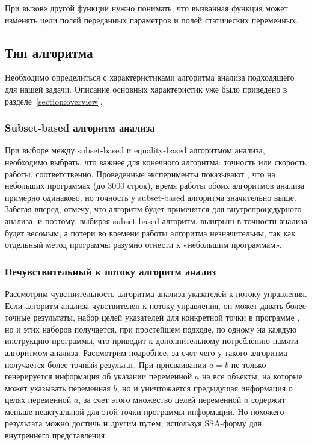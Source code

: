 \documentclass[14pt,titlepage]{extarticle}
\newenvironment{fresh}{\color{Blue}}{\color{black}}
\newcommand{\eng}[1]{{\English#1}}
\begin{document}
\begin{fresh}
      При вызове другой функции нужно понимать, что вызванная функция может
      изменять цели полей переданных параметров и полей статических переменных.


    \subsection{Тип алгоритма}

      Необходимо определиться с характеристиками алгоритма анализа
      подходящего для нашей задачи. Описание основных характеристик уже было
      приведено в разделе~\ref{section:overview}.

    \subsubsection{\eng{Subset-based} алгоритм анализа}

      При выборе между \eng{subset-based} и \eng{equality-based} алгоритмом
      анализа, необходимо выбрать, что важнее для конечного алгоритма:
      точность или скорость работы, соответственно. Проведенные эксперименты
      показывают \cite{shapiro_fast_and_accurate}, что на небольших программах
      (до 3000 строк), время работы обоих алгоритмов анализа примерно
      одинаково, но точность у \eng{subset-based} алгоритма значительно выше.
      Забегая вперед, отмечу, что алгоритм будет применятся для
      внутрепроцедурного анализа, и поэтому, выбирая \eng{subset-based}
      алгоритм, выигрыш в точности анализа будет весомым, а потери во времени
      работы алгоритма незначительны, так как отдельный метод программы
      разумно отнести к «небольшим программам».

    \subsubsection{Нечувствительный к потоку алгоритм анализ}

      Рассмотрим чувствительность алгоритма анализа указателей к потоку
      управления.  Если алгоритм анализа чувствителен к потоку управления, он
      может давать более точные результаты, набор целей указателей для
      конкретной точки в программе
      \cite[с.~57]{hind_pointer_analysis_not_solved_yet}, но и этих наборов
      получается, при простейшем подходе, по одному на каждую инструкцию
      программы, что приводит к дополнительному потреблению памяти алгоритмом
      анализа. Рассмотрим подробнее, за счет чего у такого алгоритма получается
      более точный результат. При присваивании $a = b$ не только генерируется
      информация об указании переменной $a$ на все объекты, на которые может
      указывать переменная $b$, но и уничтожается предыдущая информация о целях
      переменной $a$, за счет этого множество целей переменной $a$ содержит
      меньше неактуальной для этой точки программы информации. Но похожего
      результата можно достичь и другим путем, используя SSA-форму для
      внутреннего представления.


\end{fresh}
\end{document}
